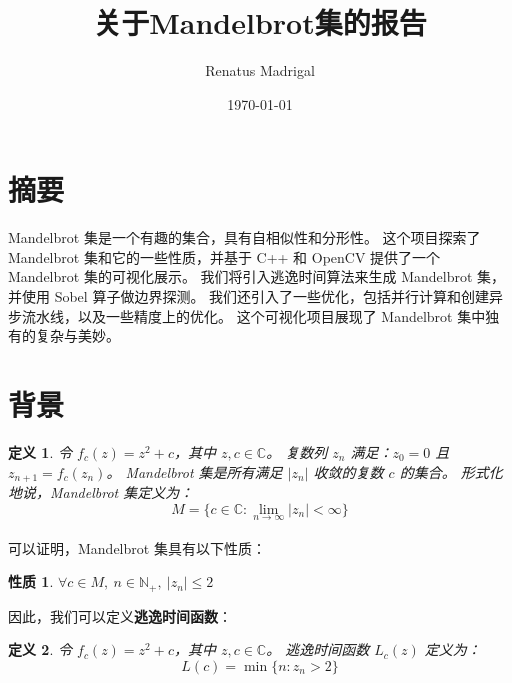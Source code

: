 \documentclass[11pt]{article}
\title{关于Mandelbrot集的报告}
\author{Renatus Madrigal}
\date{\today}
\newtheorem{definition}{定义}
\newtheorem{property}{性质}
\begin{document}
    \maketitle


    \section{摘要}\label{sec:abstract}

    Mandelbrot 集是一个有趣的集合，具有自相似性和分形性。
    这个项目探索了 Mandelbrot 集和它的一些性质，并基于 C++ 和 OpenCV 提供了一个 Mandelbrot 集的可视化展示。
    我们将引入逃逸时间算法来生成 Mandelbrot 集，并使用 Sobel 算子做边界探测。
    我们还引入了一些优化，包括并行计算和创建异步流水线，以及一些精度上的优化。
    这个可视化项目展现了 Mandelbrot 集中独有的复杂与美妙。


    \section{背景}\label{sec:background}

    \begin{definition}
        令 $f_c(z) = z^2 + c$，其中 $z, c \in \mathbb{C}$。
        复数列 $z_n$ 满足：$z_0 = 0$ 且 $z_{n+1} = f_c(z_n)$。
        Mandelbrot 集是所有满足 $|z_n|$ 收敛的复数 $c$ 的集合。
        形式化地说，Mandelbrot 集定义为：
        \begin{equation}
            \label{eq:mandelbrot_set_define}
            M = \{c \in \mathbb{C} : \lim_{n \to \infty} |z_n| < \infty\}
        \end{equation}
    \end{definition}

    可以证明\textsuperscript{\cite{branner1989mandelbrot}}，Mandelbrot 集具有以下性质：

    \begin{property}
        \label{property:bounded}
        $\forall c \in M,\ n \in \mathbb{N}_+ ,\ |z_n| \leq 2$
    \end{property}

    因此，我们可以定义\textbf{逃逸时间函数}：

    \begin{definition}
        令 $f_c(z) = z^2 + c$，其中 $z, c \in \mathbb{C}$。
        逃逸时间函数 $L_c(z)$ 定义为：
        \begin{equation}
            L(c) = \min\{n : z_n > 2\}\label{eq:layer_function}
        \end{equation}
    \end{definition}
\end{document}
